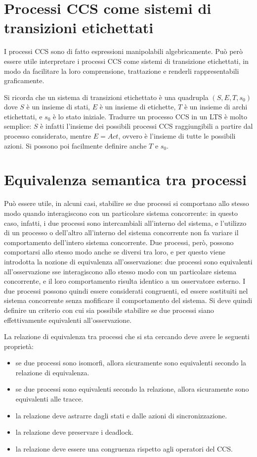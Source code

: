 \section{Processi CCS come sistemi di transizioni etichettati}
I processi CCS sono di fatto espressioni manipolabili algebricamente.
Può però essere utile interpretare i processi CCS come sistemi di transizione
etichettati, in modo da facilitare la loro comprensione, trattazione
e renderli rappresentabili graficamente.

Si ricorda che un sistema di transizioni etichettato è una quadrupla
$(S, E, T, s_0)$ dove $S$ è un insieme di stati, $E$ è un insieme di etichette,
$T$ è un insieme di archi etichettati, e $s_0$ è lo stato iniziale.
Tradurre un processo CCS in un LTS è molto semplice: $S$ è infatti l'insieme
dei possibili processi CCS raggiungibili a partire dal processo considerato,
mentre $E = Act$, ovvero è l'insieme di tutte le possibili azioni.
Si possono poi facilmente definire anche $T$ e $s_0$.

\section{Equivalenza semantica tra processi}
Può essere utile, in alcuni casi, stabilire se due processi si comportano allo
stesso modo quando interagiscono con un particolare sistema concorrente:
in questo caso, infatti, i due processi sono intercambiali all'interno del
sistema, e l'utilizzo di un processo o dell'altro all'interno del sistema
concorrente non fa variare il comportamento dell'intero sistema concorrente.
Due processi, però, possono comportarsi allo stesso modo anche se diversi tra
loro, e per questo viene introdotta la nozione di equivalenza all'osservazione:
due processi sono equivalenti all'osservazione sse interagiscono allo stesso
modo con un particolare sistema concorrente, e il loro comportamento
risulta identico a un osservatore esterno. I due processi possono quindi
essere considerati congruenti, ed essere sostituiti nel sistema
concorrente senza mofificare il comportamento del sistema.
Si deve quindi definire un criterio con cui sia possibile stabilire se
due processi siano effettivamente equivalenti all'osservazione.

La relazione di equivalenza tra processi che si sta cercando deve avere
le seguenti proprietà:
\begin{itemize}
    \item se due processi sono isomorfi, allora sicuramente sono equivalenti
    secondo la relazione di equivalenza.
    \item se due processi sono equivalenti secondo la relazione, allora
    sicuramente sono equivalenti alle tracce.
    \item la relazione deve astrarre dagli stati e dalle azioni di sincronizzazione.
    \item la relazione deve preservare i deadlock.
    \item la relazione deve essere una congruenza rispetto agli operatori del
    CCS.
\end{itemize}

